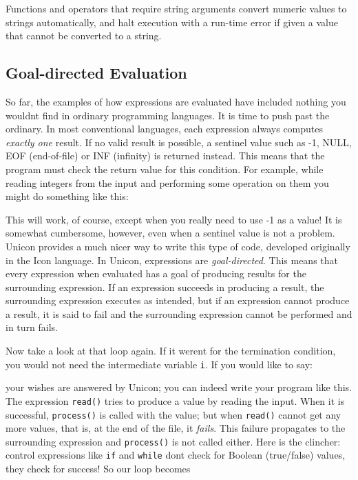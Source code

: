 Functions and operators that require string arguments convert numeric
values to strings automatically, and halt execution with a run-time
error if given a value that cannot be converted to a string.

\subsection[Goal{}-directed Evaluation]{Goal-directed Evaluation}
So far, the examples of how
expressions are evaluated have included nothing you
wouldn{\textquotesingle}t find in ordinary programming languages. It is
time to push past the ordinary.
In most conventional languages, each expression always computes
\textit{exactly one} result. If no valid result is possible, a
sentinel value such as -1, NULL, EOF
(end-of-file) or INF (infinity) is
returned instead. This means that the program must check the return
value for this condition. For example, while reading integers from the
input and performing some operation on them you might do something like
this:


This will work, of course, except when you really need to use -1 as a
value! It is somewhat cumbersome, however, even when a sentinel value
is not a problem. Unicon provides a much nicer way to write this type
of code, developed originally in the Icon language. In Unicon,
expressions are \textit{goal-directed}. This means that every
expression when evaluated has a goal of producing results for the
surrounding expression. If an expression succeeds in producing a
result, the surrounding expression executes as intended, but if an
expression cannot produce a result, it is said to fail and the surrounding expression cannot be performed and in
turn fails.

Now take a look at that loop again. If it weren{\textquotesingle}t for
the termination condition, you would not need the
intermediate variable \texttt{i}. If you would like to say:


\noindent
your wishes are answered by Unicon; you can indeed write your
program like this. The expression \texttt{read()} tries to produce a
value by reading the input. When it is successful, \texttt{process()}
is called with the value; but when \texttt{read()} cannot get any more
values, that is, at the end of the file, it \textit{fails}. This
failure propagates to the surrounding expression and \texttt{process()}
is not called either. Here is the clincher: control expressions like
\texttt{if} and \texttt{while} don{\textquotesingle}t check for Boolean
(true/false) values, they check for success! So our loop
becomes


